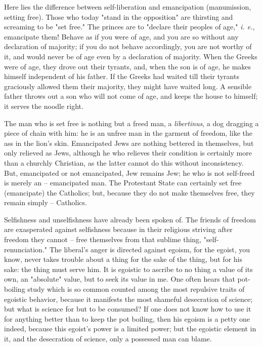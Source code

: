 \documentclass[a4paper]{book}
\begin{document}
Here lies the difference between self-liberation and emancipation 
(manumission, setting free). Those who today "{}stand in the opposition"{} are 
thirsting and screaming to be "{}set free."{} The princes are to "{}declare 
their peoples of age,"{} \textit{i. e.}, emancipate them! Behave as if you 
were of age, and you are so without any declaration of majority; if you do not 
behave accordingly, you are not worthy of it, and would never be of age even 
by a declaration of majority. When the Greeks were of age, they drove out 
their tyrants, and, when the son is of age, he makes himself independent of 
his father. If the Greeks had waited till their tyrants graciously allowed 
them their majority, they might have waited long. A sensible father throws out 
a son who will not come of age, and keeps the house to himself; it serves the 
noodle right.

The man who is set free is nothing but a freed man, a \textit{libertinus}, a 
dog dragging a piece of chain with him: he is an unfree man in the garment of 
freedom, like the ass in the lion's skin. Emancipated Jews are nothing 
bettered in themselves, but only relieved as Jews, although he who relieves 
their condition is certainly more than a churchly Christian, as the latter 
cannot do this without inconsistency. But, emancipated or not emancipated, Jew 
remains Jew; he who is not self-freed is merely an -- emancipated man. The 
Protestant State can certainly set free (emancipate) the Catholics; but, 
because they do not make themselves free, they remain simply -- Catholics.

Selfishness and unselfishness have already been spoken of. The friends of 
freedom are exasperated against selfishness because in their religious 
striving after freedom they cannot -- free themselves from that sublime thing, 
"{}self-renunciation."{} The liberal's anger is directed against egoism, for 
the egoist, you know, never takes trouble about a thing for the sake of the 
thing, but for his sake: the thing must serve him. It is egoistic to ascribe 
to no thing a value of its own, an "{}absolute"{} value, but to seek its value 
in me. One often hears that pot-boiling study which is so common counted among 
the most repulsive traits of egoistic behavior, because it manifests the most 
shameful desecration of science; but what is science for but to be consumed? 
If one does not know how to use it for anything better than to keep the pot 
boiling, then his egoism is a petty one indeed, because this egoist's power is 
a limited power; but the egoistic element in it, and the desecration of 
science, only a possessed man can blame.
\end{document}
